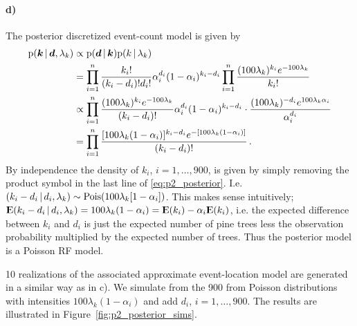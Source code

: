\paragraph{d)}
The posterior discretized  event-count model is given by
%
\begin{align}
\label{eq:p2_posterior}
    \mathrm{p}(\bm{k} \, | \, \bm{d}, \lambda_k) &\propto \mathrm{p}(\bm{d} \, | \, \bm{k}) \mathrm{p}(k \, | \, \lambda_k) \\
    &= \prod_{i=1}^n \frac{k_i!}{(k_i - d_i)!d_i!} \alpha_i^{d_i} (1 - \alpha_i)^{k_i - d_i} \prod_{i=1}^n \frac{(100\lambda_k)^{k_i} e^{-100\lambda_k}}{k_i!} \\
    &\propto \prod_{i=1}^n \frac{(100\lambda_k)^{k_i} e^{-100\lambda_k}}{(k_i - d_i)!} \alpha_i^{d_i} (1 - \alpha_i)^{k_i - d_i} \cdot \frac{(100\lambda_k)^{-d_i} e^{100\lambda_k\alpha_i}}{\alpha_i^{d_i}} \\
    &= \prod_{i=1}^n \frac{[100\lambda_k(1-\alpha_i)]^{k_i-d_i} e^{-[100\lambda_k(1-\alpha_i)]}}{(k_i-d_i)!} \, .
\end{align}
%
By independence the density of $k_i$, $i = 1, \dots, 900$, is given by simply removing the product symbol in the last line of \eqref{eq:p2_posterior}. I.e. $(k_i - d_i \, | \, d_i, \lambda_k) \sim \mathrm{Pois}(100\lambda_k[1-\alpha_i])$. This makes sense intuitively; ${\rm I\kern-.3em E}(k_i - d_i \, | \, d_i, \lambda_k) = 100\lambda_k(1-\alpha_i) = {\rm I\kern-.3em E}(k_i) - \alpha_i{\rm I\kern-.3em E}(k_i)$, i.e. the expected difference between $k_i$ and $d_i$ is just the expected number of pine trees less the observation probability multiplied by the expected number of trees. Thus the posterior model is a Poisson RF model.

10 realizations of the associated approximate event-location model are generated in a similar way as in c). We simulate from the 900 from Poisson distributions with intensities $100\lambda_k(1-\alpha_i)$ and add $d_i$, $i = 1, \dots, 900$. The results are illustrated in Figure~\ref{fig:p2_posterior_sims}.

